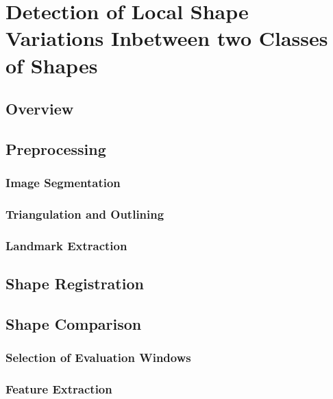 \documentclass[pdftex,12pt,a4paper]{report}
\begin{document}
\cite{pedregosa2011scikit}

\chapter{Detection of Local Shape Variations Inbetween two Classes of Shapes}

\section{Overview}

\section{Preprocessing}

\subsection{Image Segmentation}

\cite{achanta2012slic}
\cite{felzenszwalb2004efficient}
\cite{houhou2009fast}
\cite{jain1990unsupervised}
\cite{haralick1973textural}

\subsection{Triangulation and Outlining}

\cite{akkirajualpha}

\subsection{Landmark Extraction}

\section{Shape Registration}

\section{Shape Comparison}

\subsection{Selection of Evaluation Windows}

\subsection{Feature Extraction}
\end{document}
